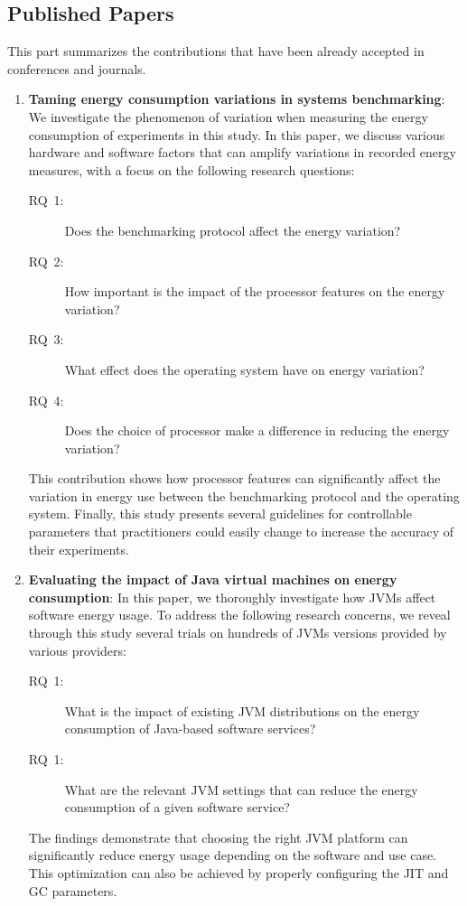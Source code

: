 \subsection{Published Papers}
This part summarizes the contributions that have been already accepted in conferences and journals.

\begin{enumerate}
      \item \textbf{Taming energy consumption variations in systems benchmarking}:
            We investigate the phenomenon of variation when measuring the energy consumption of experiments in this study.
            In this paper, we discuss various hardware and software factors that can amplify variations in recorded energy measures, with a focus on the following research questions:
            \begin{description}
                  \item[\textsc{RQ}~1:] Does the benchmarking protocol affect the energy variation?
                  \item[\textsc{RQ}~2:] How important is the impact of the processor features on the energy variation?
                  \item[\textsc{RQ}~3:] What effect does the operating system have on energy variation?
                  \item[\textsc{RQ}~4:] Does the choice of processor make a difference in reducing the energy variation?
            \end{description}

            This contribution shows how processor features can significantly affect the variation in energy use between the benchmarking protocol and the operating system.
            Finally, this study presents several guidelines for controllable parameters that practitioners could easily change to increase the accuracy of their experiments.



      \item \textbf{Evaluating the impact of Java virtual machines on energy consumption}:
            In this paper, we thoroughly investigate how JVMs affect software energy usage.
            To address the following research concerns, we reveal through this study several trials on hundreds of JVMs versions provided by various providers:
            \begin{description}
                  \item[\textsc{RQ}~1:] What is the impact of existing JVM distributions on the energy consumption of Java-based software services?
                  \item [\textsc{RQ}~1:] What are the relevant JVM settings that can reduce the energy consumption of a given software service?
            \end{description}
            The findings demonstrate that choosing the right JVM platform can significantly reduce energy usage depending on the software and use case.
            This optimization can also be achieved by properly configuring the JIT and GC parameters.


\end{enumerate}
